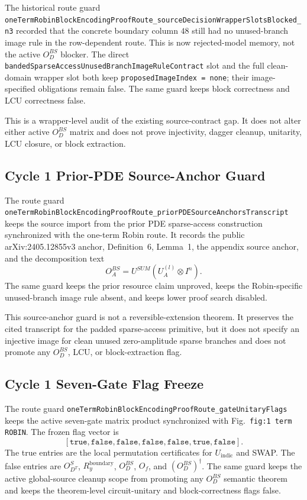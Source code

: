 The historical route guard
\texttt{oneTermRobinBlockEncodingProofRoute\_sourceDecisionWrapperSlotsBlocked\_n3}
recorded that the concrete boundary column \(48\) still had no unused-branch
image rule in the row-dependent route.  This is now rejected-model memory, not
the active \(O_D^{BS}\) blocker.  The direct
\texttt{bandedSparseAccessUnusedBranchImageRuleContract} slot and the full
clean-domain wrapper slot both keep \texttt{proposedImageIndex = none}; their
image-specified obligations remain false.  The same guard keeps block
correctness and LCU correctness false.

This is a wrapper-level audit of the existing source-contract gap.  It does
not alter either active \(O_D^{BS}\) matrix and does not prove injectivity,
dagger cleanup, unitarity, LCU closure, or block extraction.

\subsection{Cycle 1 Prior-PDE Source-Anchor Guard}

The route guard
\texttt{oneTermRobinBlockEncodingProofRoute\_priorPDESourceAnchorsTranscript}
keeps the source import from the prior PDE sparse-access construction
synchronized with the one-term Robin route.  It records the public
arXiv:2405.12855v3 anchor, Definition~6, Lemma~1, the appendix source anchor,
and the decomposition text
\[
  O_A^{BS} = U^{SUM}(U_A^{(l)} \otimes I^n).
\]
The same guard keeps the prior resource claim unproved, keeps the
Robin-specific unused-branch image rule absent, and keeps lower proof search
disabled.

This source-anchor guard is not a reversible-extension theorem.  It preserves
the cited transcript for the padded sparse-access primitive, but it does not
specify an injective image for clean unused zero-amplitude sparse branches and
does not promote any \(O_D^{BS}\), LCU, or block-extraction flag.

\subsection{Cycle 1 Seven-Gate Flag Freeze}

The route guard
\texttt{oneTermRobinBlockEncodingProofRoute\_gateUnitaryFlags} keeps the active
seven-gate matrix product synchronized with Fig.~\texttt{fig:1 term ROBIN}.
The frozen flag vector is
\[
  [\texttt{true},\texttt{false},\texttt{false},\texttt{false},
   \texttt{false},\texttt{true},\texttt{false}].
\]
The true entries are the local permutation certificates for
\(U_{\mathrm{indic}}\) and SWAP.  The false entries are
\(O_{D^T}^{S}\), \(R_y^{\mathrm{boundary}}\), \(O_D^{BS}\), \(O_f\), and
\((O_D^{BS})^\dagger\).  The same guard keeps the active global-source cleanup
scope from promoting any \(O_D^{BS}\) semantic theorem and keeps the
theorem-level circuit-unitary and block-correctness flags false.

